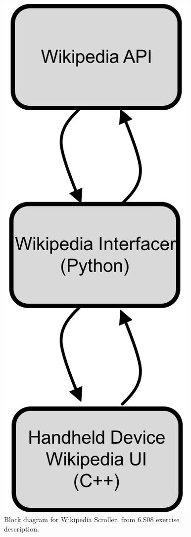 \documentclass[12pt]{article}
\begin{document}
\begin{figure}[h]
\centering
\includegraphics[scale=0.5]{wiki-block-diagram.png}
\caption{Block diagram for Wikipedia Scroller, from 6.S08 exercise description.}
\label{fig:wiki-scroller-block}
\end{figure}
\end{document}
